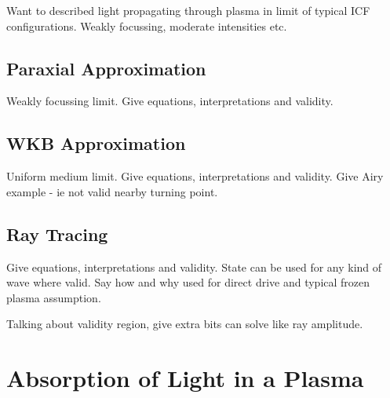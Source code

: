 Want to described light propagating through plasma in limit of typical ICF configurations.
Weakly focussing, moderate intensities etc.


\subsection{Paraxial Approximation}%
\label{sec:theory_paraxial}

Weakly focussing limit.
Give equations, interpretations and validity.

\subsection{WKB Approximation}%
\label{sec:theory_WKB}

Uniform medium limit.
Give equations, interpretations and validity.
Give Airy example - ie not valid nearby turning point.

\subsection{Ray Tracing}%
\label{sec:theory_rays}

Give equations, interpretations and validity.
State can be used for any kind of wave where valid.
Say how and why used for direct drive and typical frozen plasma assumption.

Talking about validity region, give extra bits can solve like ray amplitude.


\section{Absorption of Light in a Plasma}%
\label{sec:theory_absorption}

